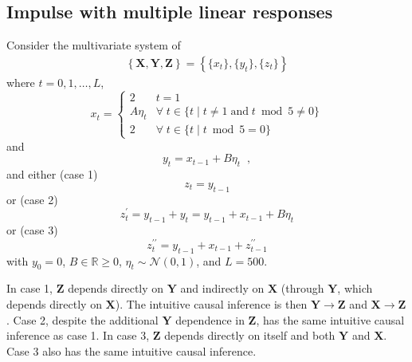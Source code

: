\subsection{Impulse with multiple linear responses}
\label{sec:3var}
Consider the multivariate system of
\begin{eqnarray}
\label{eqn:3var}
\left\{\mathbf{X},\mathbf{Y},\mathbf{Z}\right\} = \left\{\{x_t\},\{y_t\},\{z_t\}\right\}
\end{eqnarray}
where $t=0,1,\ldots,L$,
\begin{equation*}
x_t = \left\{
  \begin{array}{lr}
    2 & t = 1\\
    A\eta_t & \forall\; t\in\{t\;|\;t\neq 1 \;\mathrm{and}\; t\bmod 5 \neq 0\}\\
    2 & \forall\; t\in\{t\;|\;t\bmod 5 = 0\}
  \end{array}
\right.
\end{equation*}
and
\begin{equation*}
y_t = x_{t-1} + B\eta_t\;\;,
\end{equation*}
and either (case 1)
\begin{equation}
z_t = y_{t-1}
\end{equation}
or (case 2)
\begin{equation}
z_t^\prime = y_{t-1} + y_t = y_{t-1} + x_{t-1} + B\eta_t
\end{equation}
or (case 3)
\begin{equation}
z_t^{\prime\prime} = y_{t-1} + x_{t-1} + z_{t-1}^{\prime\prime}
\end{equation}
with $y_0 = 0$, $B\in\mathbb{R}\ge 0$, $\eta_t\sim\mathcal{N}\left(0,1\right)$, and $L=500$.

In case 1, $\mathbf{Z}$ depends directly on $\mathbf{Y}$ and indirectly on $\mathbf{X}$ (through $\mathbf{Y}$, which depends directly on $\mathbf{X}$).  The intuitive causal inference is then $\mathbf{Y}\rightarrow\mathbf{Z}$ and $\mathbf{X}\rightarrow\mathbf{Z}$.  Case 2, despite the additional $\mathbf{Y}$ dependence in $\mathbf{Z}$, has the same intuitive causal inference as case 1.  In case 3, $\mathbf{Z}$ depends directly on itself and both $\mathbf{Y}$ and $\mathbf{X}$.  Case 3 also has the same intuitive causal inference.

